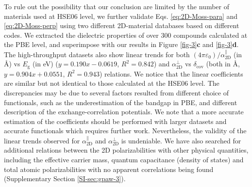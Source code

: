 \documentclass[journal=ancac3,manuscript=article,email=true,hyperref=true,keywords=false]{achemso}
\begin{document}
To rule out the possibility that our conclusion are limited by the
number of materials used at HSE06 level, we further validate
Eqs. \ref{eq:2D-Moss-para} and \ref{eq:2D-Moss-perp} using two
different 2D-material databases based on different codes\cite{Haastrup_2018,Mounet_2018}. 
%
We extracted the dielectric properties of over 300 compounds
calculated at the PBE level, and superimpose with our results in
Figure \ref{fig-3}{\textbf c} and \ref{fig-3}{\textbf d}. 
%
The high-throughput datasets also show linear trends for both
$(4\pi\varepsilon_0)/\alpha_{\mathrm{2D}}^{\parallel}$ (in \AA{}) vs
$E_{\mathrm{g}}$ (in eV) ($y=0.190x - 0.0619$, $R^{2}=0.842$) and
$\alpha_{\mathrm{2D}}^{\perp}$ vs $\delta_{\mathrm{cov}}$ (both in
\AA{}, $y=0.904x + 0.0551$, $R^{2} = 0.943$) relations. We notice that the
linear coefficients are similar but not identical to those calculated
at the HSE06 level. The discrepancies may be due to several factors
resulted from different choice of functionals, such as the underestimation
of the bandgap in PBE, and different description of the 
exchange-correlation potentials. 
%
We note that a more accurate estimation of the
coefficients should be performed with larger datasets and accurate
functionals which requires further work. Nevertheless, 
the validity of the linear trends observed for
$\alpha_{\mathrm{2D}}^{\parallel}$ and $\alpha_{\mathrm{2D}}^{\perp}$ 
is undeniable. We have also
searched for additional relations between the 2D polarizabilities with
other physical quantities, including the effective carrier mass,
quantum capacitance (density of states) and total atomic
polarizabilities with no apparent correlations being found
(Supplementary Section \ref{SI-sec:gpaw-3}).
\end{document}
